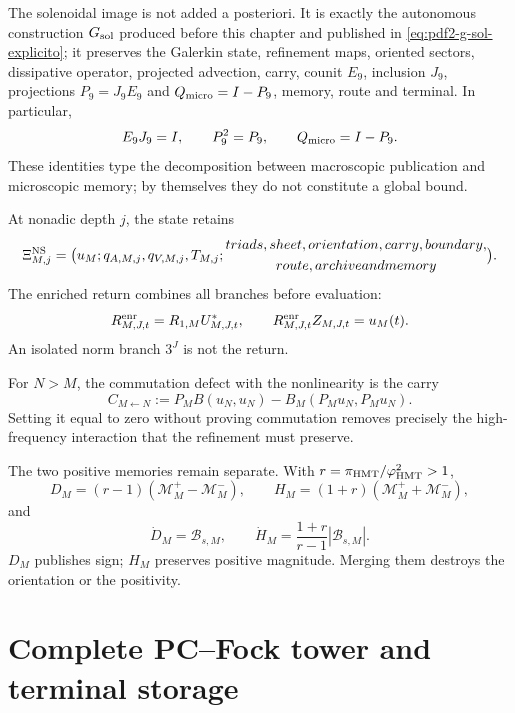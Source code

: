The solenoidal image is not added a posteriori. It is exactly the autonomous
construction $\mathfrak G_{\rm sol}$ produced before this chapter and published in
\eqref{eq:pdf2-g-sol-explicito}; it preserves the
Galerkin state, refinement maps, oriented sectors, dissipative operator,
projected advection, carry, counit $E_9$, inclusion $J_9$,
projections $P_9=J_9E_9$ and $Q_{\rm micro}=I-P_9$, memory, route and terminal.
In particular,
\[
 E_9J_9=I,
 \qquad P_9^2=P_9,
 \qquad Q_{\rm micro}=I-P_9.
\]
These identities type the decomposition between macroscopic publication and
microscopic memory; by themselves they do not constitute a global bound.

At nonadic depth $j$, the state retains
\begin{equation}\label{eq:pdf2-ns-estado}
 \Xi_{M,j}^{\rm NS}=
 \bigl(u_M;q_{A,M,j},q_{V,M,j},T_{M,j};
 \begin{gathered}
 \text{triads, sheet, orientation, carry, boundary,}\\
 \text{route, archive and memory}
 \end{gathered}
 \bigr).
\end{equation}
The enriched return combines all branches before evaluation:
\begin{equation}\label{eq:pdf2-ns-retorno}
 \mathcal R_{M,J,t}^{\rm enr}
 =\mathcal R_{1,M}\mathfrak U_{M,J,t}^*,
 \qquad
 \mathcal R_{M,J,t}^{\rm enr}Z_{M,J,t}=u_M(t).
\end{equation}
An isolated norm branch $3^J$ is not the return.

For $N>M$, the commutation defect with the nonlinearity is the carry
\begin{equation}\label{eq:pdf2-ns-carry}
 C_{M\leftarrow N}:=
 P_MB(u_N,u_N)-B_M(P_Mu_N,P_Mu_N).
\end{equation}
Setting it equal to zero without proving commutation removes precisely the high-frequency
interaction that the refinement must preserve.

The two positive memories remain separate. With
$r=\pi_{\rm HMT}/\varphi_{\rm HMT}^2>1$,
\begin{equation}\label{eq:pdf2-ns-dh}
 D_M=(r-1)(\mathcal M_M^+-\mathcal M_M^-),
 \qquad
 H_M=(1+r)(\mathcal M_M^++\mathcal M_M^-),
\end{equation}
and
\[
 \dot D_M=\mathscr B_{s,M},
 \qquad
 \dot H_M=\frac{1+r}{r-1}|\mathscr B_{s,M}|.
\]
$D_M$ publishes sign; $H_M$ preserves positive magnitude. Merging them destroys the
orientation or the positivity.

\section{Complete PC--Fock tower and terminal storage}

